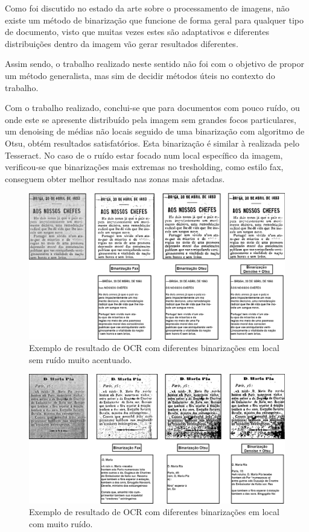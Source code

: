 Como foi discutido no estado da arte sobre o processamento de imagens, não existe um método de binarização que funcione de forma geral para qualquer tipo de documento, visto que muitas vezes estes são adaptativos e diferentes distribuições dentro da imagem vão gerar resultados diferentes.

Assim sendo, o trabalho realizado neste sentido não foi com o objetivo de propor um método generalista, mas sim de decidir métodos úteis no contexto do trabalho.

Com o trabalho realizado, conclui-se que para documentos com pouco ruído, ou onde este se apresente distribuído pela imagem sem grandes focos particulares, um denoising de médias não locais seguido de uma binarização com algoritmo de Otsu, obtém resultados satisfatórios. Esta binarização é similar à realizada pelo Tesseract.
No caso de o ruído estar focado num local específico da imagem, verificou-se que binarizações mais extremas no tresholding, como estilo fax, conseguem obter melhor resultado nas zonas mais afetadas.


\begin{figure}[H]
	\centering
	\includegraphics[width=\textwidth]{images/ilustracoes/ocr_different_binarizations.png}
	\caption{Exemplo de resultado de OCR com diferentes binarizações em local sem ruído muito acentuado.}
	\label{fig:ocr_different_binarizations}
\end{figure}


\begin{figure}[H]
	\centering
	\includegraphics[width=\textwidth]{images/ilustracoes/ocr_different_binarizations_noisy.png}
	\caption{Exemplo de resultado de OCR com diferentes binarizações em local com muito ruído.}
	\label{fig:ocr_different_binarizations_noisy}
\end{figure}


